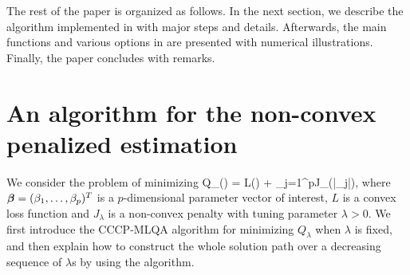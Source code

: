 The rest of the paper is organized as follows.
In the next section, we describe the algorithm implemented in  with major steps and details.
Afterwards, the main functions and various options in  are presented with numerical illustrations.
Finally, the paper concludes with remarks.



\section{An algorithm for the non-convex penalized estimation}

We consider the problem of minimizing
\beqn\label{ncp:pro}
    Q_{\lambda}\left(\bbeta\right) = L\left(\bbeta\right) + \sum_{j=1}^pJ_{\lambda}\left(|\beta_j|\right),
\eeqn
where $\mbox{\boldmath{$\beta$}}=(\beta_1,\ldots,\beta_p)^T$ is a $p$-dimensional parameter vector of interest, $L$ is a convex loss function
and $J_\lambda$ is a non-convex penalty with tuning parameter $\lambda>0$.
We first introduce the CCCP-MLQA algorithm for minimizing $Q_\lambda$ when $\lambda$ is fixed,
and then explain how to construct the whole solution path over a decreasing sequence of $\lambda$s by using the algorithm.



